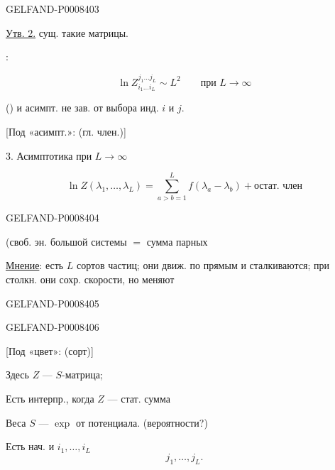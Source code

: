 \begin{GelfandAdjacentEvidence}{GELFAND-P000840}{3}


\uline{Утв. 2.} сущ. такие матрицы.

:

\begin{equation*}
\ln Z^{j_1\ldots j_L}_{i_1\ldots i_L}\sim L^2
\qquad\text{при }L\to\infty\tag{4}
\end{equation*}

() и асимпт. не зав. от выбора инд. \(i\) и \(j\).

[Под «асимпт.»: (гл. член.)]

 3. Асимптотика при \(L\to\infty\)

\begin{equation*}
\ln Z(\lambda_1,\ldots,\lambda_L)
=\sum_{a>b=1}^{L}f(\lambda_a-\lambda_b)+\text{остат. член}\tag{5}
\end{equation*}
\end{GelfandAdjacentEvidence}
\begin{GelfandAdjacentEvidence}{GELFAND-P000840}{4}


(своб. эн. большой системы \(=\) сумма парных

\uline{Мнение}: есть \(L\) сортов частиц; они движ. по прямым и сталкиваются; при столкн. они сохр. скорости, но меняют 
\end{GelfandAdjacentEvidence}
\begin{GelfandAdjacentEvidence}{GELFAND-P000840}{5}

\end{GelfandAdjacentEvidence}
\begin{GelfandAdjacentEvidence}{GELFAND-P000840}{6}


[Под «цвет»: (сорт)]

Здесь \(Z\) — \(S\)-матрица;

Есть интерпр., когда \(Z\) — стат. сумма

Веса \(S\) — \(\exp\) от потенциала. (вероятности?)

Есть нач. и  \(i_1,\ldots,i_L\)
\[
j_1,\ldots,j_L.
\]

\end{GelfandAdjacentEvidence}
